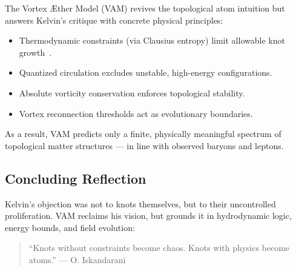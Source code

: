 The Vortex Æther Model (VAM) revives the topological atom intuition but answers Kelvin’s critique with concrete physical principles:

\begin{itemize}
  \item Thermodynamic constraints (via Clausius entropy) limit allowable knot growth~\cite{clausius1865entropy}.
  \item Quantized circulation excludes unstable, high-energy configurations.
  \item Absolute vorticity conservation enforces topological stability.
  \item Vortex reconnection thresholds act as evolutionary boundaries.
\end{itemize}

As a result, VAM predicts only a finite, physically meaningful spectrum of topological matter structures — in line with observed baryons and leptons.

\subsection*{Concluding Reflection}

Kelvin’s objection was not to knots themselves, but to their uncontrolled proliferation. VAM reclaims his vision, but grounds it in hydrodynamic logic, energy bounds, and field evolution:

\begin{quote}
“Knots without constraints become chaos. Knots with physics become atoms.” — O. Iskandarani
\end{quote}

